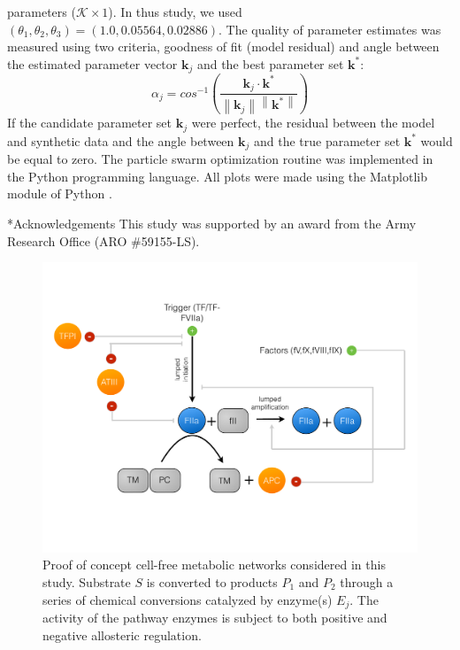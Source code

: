 \documentclass[12pt]{article}
\makeatletter
\renewcommand\section{\@startsection
	{subsection}{2}{0mm}
	{-0.2in}
	{0.05\baselineskip}
	{\normalfont\large\bfseries}}
\newcommand{\norm}[1]{\left\lVert#1\right\rVert}
\makeatother
\begin{document}
parameters ($\mathcal{K}\times{1}$). In thus study, we used $\left(\theta_{1},\theta_{2},\theta_{3}\right) = \left(1.0, 0.05564, 0.02886\right)$. The quality of parameter
estimates was measured using two criteria, goodness of fit (model residual) and angle between the estimated parameter vector $\mathbf{k}_{j}$ and the best parameter set $\mathbf{k}^{*}$:
\begin{equation}
	\alpha_{j} = cos^{-1}\left(\frac{\mathbf{k}_{j}\cdot{\mathbf{k^{*}}}}{\norm{\mathbf{k}_{j}}\norm{\mathbf{k^{*}}}}\right)
\end{equation}If the candidate parameter set $\mathbf{k}_{j}$ were perfect, the residual between the model and synthetic data 
and the angle between $\mathbf{k}_{j}$ and the true parameter set $\mathbf{k}^{*}$ would be equal to zero.
The particle swarm optimization routine was implemented in the Python programming language. 
All plots were made using the Matplotlib module of Python \citep{Matplotlib}.

\section*{Acknowledgements}
This study was supported by an award from the Army Research Office (ARO \#59155-LS).

\clearpage
%
%




\clearpage

\begin{figure}
\centering
\includegraphics[width=1.0\textwidth]{./figs/Figure-1-Network.pdf}
\caption{Proof of concept cell-free metabolic networks considered in this study. Substrate $S$ is converted to products $P_{1}$ and $P_{2}$ through a series of chemical conversions
catalyzed by enzyme(s) $E_{j}$. The activity of the pathway enzymes is subject to both positive and negative allosteric regulation. }\label{fig-networks}
\end{figure}
\end{document}
